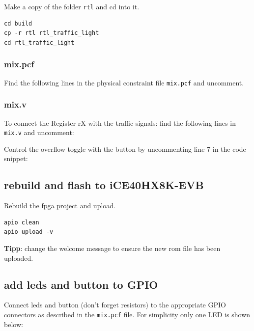 \documentclass[a4paper,ngerman]{scrartcl}
\begin{document}
Make a copy of the folder \lstinline|rtl| and cd into it.

\begin{lstlisting}[numbers=none,frame=none]
cd build
cp -r rtl rtl_traffic_light
cd rtl_traffic_light
\end{lstlisting}


\subsubsection{mix.pcf}

Find the following lines in the physical constraint file \lstinline|mix.pcf| and uncomment.



\subsubsection{mix.v}

To connect the Register rX with the traffic signals: find the following lines in \lstinline|mix.v| and uncomment:



Control the overflow toggle with the button by uncommenting line 7 in the code snippet:



\subsection{rebuild and flash to iCE40HX8K-EVB}

Rebuild the fpga project and upload.

\begin{lstlisting}[numbers=none,frame=none]
apio clean
apio upload -v
\end{lstlisting}

\textbf{Tipp}: change the welcome message to ensure the new rom file has been uploaded.

\subsection{add leds and button to GPIO}
Connect leds and button (don't forget resistors) to the appropriate GPIO connectors as described in the \lstinline|mix.pcf| file. For simplicity only one LED is shown below:

\begin{figure}[H]
	\centering
	

\end{figure}
\end{document}

